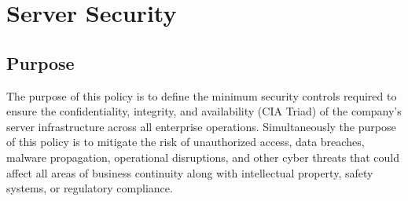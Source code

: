 \chapter{Server Security}
\pagestyle{fancy}

\fancyhf{}

\fancyfoot[C]{\thepage}

\renewcommand{\headrulewidth}{0pt}
\renewcommand{\footrulewidth}{0pt}

\section{Purpose}
The purpose of this policy is to define the minimum security controls required to ensure the confidentiality, integrity, and availability (CIA Triad) of the company’s server infrastructure across all enterprise operations. Simultaneously the purpose of this policy is to mitigate the risk of unauthorized access, data breaches, malware propagation, operational disruptions, and other cyber threats that could affect all areas of business continuity along with intellectual property, safety systems, or regulatory compliance.
